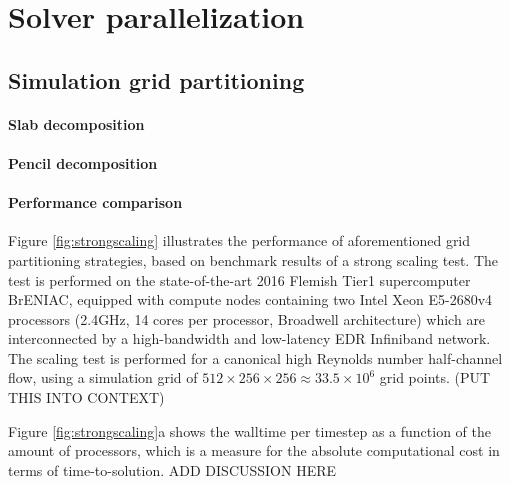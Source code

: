 \documentclass[]{article}
\title{}
\author{}
\begin{document}
\maketitle

\section{Solver parallelization}

\subsection{Simulation grid partitioning}

\paragraph{Slab decomposition}

\paragraph{Pencil decomposition}

\paragraph{Performance comparison}
Figure \ref{fig:strongscaling} illustrates the performance of aforementioned grid partitioning strategies, based on benchmark results of a strong scaling test. The test is performed on the state-of-the-art 2016 Flemish Tier1 supercomputer BrENIAC, equipped with compute nodes containing two Intel Xeon E5-2680v4 processors (2.4GHz, 14 cores per processor, Broadwell architecture) which are interconnected by a high-bandwidth and low-latency EDR Infiniband network. The scaling test is performed for a canonical high Reynolds number half-channel flow, using a simulation grid of $512 \times 256 \times 256 \approx 33.5 \times 10^6$ grid points. (PUT THIS INTO CONTEXT)


Figure \ref{fig:strongscaling}a shows the walltime per timestep as a function of the amount of processors, which is a measure for the absolute computational cost in terms of time-to-solution. ADD DISCUSSION HERE
\end{document}
